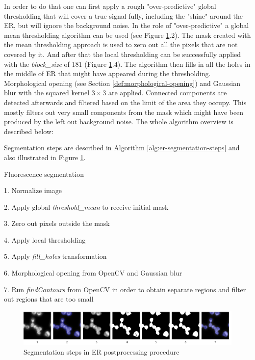 In order to do that one can first apply a rough "over-predictive" global thresholding that will cover a true signal fully, including the "shine" around the ER, but will ignore the background noise. In the role of "over-predictive" a global mean thresholding algorithm can be used (see Figure \ref{fig:er-segmentation-steps}.2). The mask created with the mean thresholding approach is used to zero out all the pixels that are not covered by it. And after that the local thresholding can be successfully applied with the \textit{block\_size} of $181$ (Figure \ref{fig:er-segmentation-steps}.4). The algorithm then fills in all the holes in the middle of ER that might have appeared during the thresholding. Morphological opening (see Section \ref{def:morphological-opening}) and Gaussian blur with the squared kernel $3 \times 3$ are applied. Connected components are detected afterwards and filtered based on the limit of the area they occupy. This mostly filters out very small components from the mask which might have been produced by the left out background noise. The whole algorithm overview is described below:

Segmentation steps are described in Algorithm \ref{alg:er-segmentation-steps} and also illustrated in Figure \ref{fig:er-segmentation-steps}.

\begin{algorithm}
    \caption{Fluorescence segmentation}
    \begin{algorithmic}
    \item 1. Normalize image
    \item 2. Apply global \textit{threshold\_mean} to receive initial mask
    \item 3. Zero out pixels outside the mask
    \item 4. Apply local thresholding
    \item 5. Apply \textit{fill\_holes} transformation
    \item 6. Morphological opening from OpenCV and Gaussian blur
    \item 7. Run \textit{findContours} from OpenCV in order to obtain separate regions and filter out regions that are too small
    \end{algorithmic}
    \label{alg:er-segmentation-steps}
\end{algorithm}    

\begin{figure}[htb]
    \begin{center}
        \includegraphics[width=\linewidth]{bilder/ER/segmentation/segmentation.png}
        \caption{Segmentation steps in ER postprocessing procedure}\label{fig:er-segmentation-steps}
    \end{center}
\end{figure}